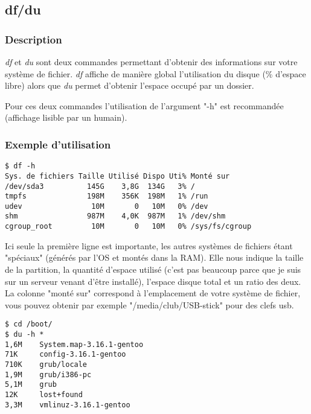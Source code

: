 \subsection*{df/du}
\subsubsection*{Description}
\emph{df} et \emph{du} sont deux commandes permettant d'obtenir des informations sur votre système de fichier.
\emph{df} affiche de manière global l'utilisation du disque (\% d'espace libre) alors que \emph{du} permet d'obtenir l'espace occupé par un dossier.

\noindent Pour ces deux commandes l'utilisation de l'argument "-h" est recommandée (affichage lisible par un humain).

\subsubsection*{Exemple d'utilisation}

\begin{lstlisting}
$ df -h
Sys. de fichiers Taille Utilisé Dispo Uti% Monté sur
/dev/sda3          145G    3,8G  134G   3% /
tmpfs              198M    356K  198M   1% /run
udev                10M       0   10M   0% /dev
shm                987M    4,0K  987M   1% /dev/shm
cgroup_root         10M       0   10M   0% /sys/fs/cgroup
\end{lstlisting}

Ici seule la première ligne est importante, les autres systèmes de fichiers étant "spéciaux" (générés par l'OS et montés dans la RAM).
Elle nous indique la taille de la partition, la quantité d'espace utilisé (c'est pas beaucoup parce que je suis sur un serveur venant d'être installé), l'espace disque total et un ratio des deux.
La colonne "monté sur" correspond à l'emplacement de votre système de fichier, vous pouvez obtenir par exemple "/media/club/USB-stick" pour des clefs usb.

\begin{lstlisting}
$ cd /boot/
$ du -h *
1,6M    System.map-3.16.1-gentoo
71K     config-3.16.1-gentoo
710K    grub/locale
1,9M    grub/i386-pc
5,1M    grub
12K     lost+found
3,3M    vmlinuz-3.16.1-gentoo
\end{lstlisting}
